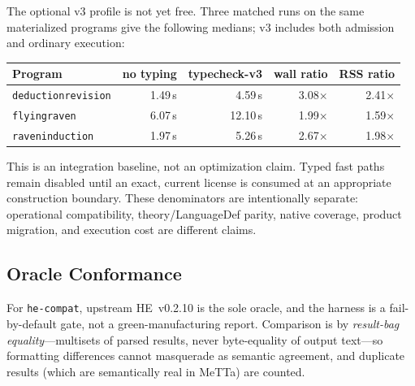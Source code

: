 \documentclass[11pt]{article}
\newcommand{\code}[1]{\texttt{#1}}
\newcommand{\HE}{\textup{HE}}
\begin{document}
The optional v3 profile is not yet free.  Three matched runs on the same
materialized programs give the following medians; v3 includes both admission
and ordinary execution:

\begin{center}
\begin{tabular}{lrrrr}
\toprule
Program & no typing & typecheck-v3 & wall ratio & RSS ratio \\
\midrule
\code{deductionrevision} & 1.49\,s & 4.59\,s & 3.08$\times$ & 2.41$\times$ \\
\code{flyingraven}       & 6.07\,s & 12.10\,s & 1.99$\times$ & 1.59$\times$ \\
\code{raveninduction}    & 1.97\,s & 5.26\,s & 2.67$\times$ & 1.98$\times$ \\
\bottomrule
\end{tabular}
\end{center}

This is an integration baseline, not an optimization claim.  Typed fast paths
remain disabled until an exact, current license is consumed at an appropriate
construction boundary.  These denominators are intentionally separate:
operational compatibility, theory/LanguageDef parity, native coverage,
product migration, and execution cost are different claims.

\subsection{Oracle Conformance}
\label{sec:conformance}

For \code{he-compat}, upstream \HE{}~v0.2.10 is the sole oracle, and
the harness is a fail-by-default gate, not a green-manufacturing
report.  Comparison is by \emph{result-bag equality}---multisets of
parsed results, never byte-equality of output text---so formatting
differences cannot masquerade as semantic agreement, and duplicate
results (which are semantically real in MeTTa) are counted.
\end{document}
